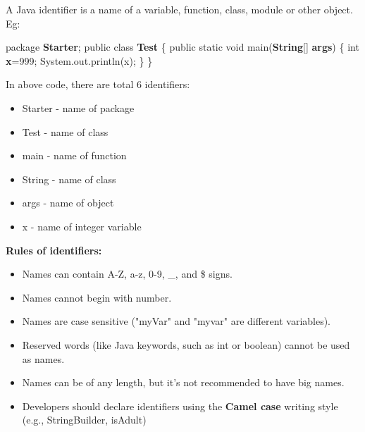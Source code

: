 
\begin{flushleft}
	
	A Java identifier is a name of a variable, function, class, module or other object.
	\newline
	Eg:
	\begin{tcolorbox}[breakable,notitle,boxrule=-0pt,colback=code,colframe=code]
		\color{black}
		\font=8pt
		package \textbf{Starter}; \newline
		\newline
		public class \textbf{Test} \{ \newline
		\hphantom{} \hphantom{}	public static void main(\textbf{String}[] \textbf{args}) \{ \newline
		\hphantom{} \hphantom{} \hphantom{} \hphantom{}	int \textbf{x}=999; \newline
		\hphantom{} \hphantom{} \hphantom{} \hphantom{}	System.out.println(x); \newline
		\hphantom{} \hphantom{}	\} \newline
		\}
		\font=4pt
	\end{tcolorbox}
	
	\bigskip
	In above code, there are total 6 identifiers:
	\begin{itemize}
		\item Starter - name of package
		\item Test - name of class
		\item main - name of function
		\item String - name of class 
		\item args - name of object
		\item x - name of integer variable
	\end{itemize}
	
	\textbf{Rules of identifiers:}
	\begin{itemize}
		\item Names can contain A-Z, a-z, 0-9, \_, and \$ signs.
		\item Names cannot begin with number.
		\item Names are case sensitive ("myVar" and "myvar" are different variables).
		\item Reserved words (like Java keywords, such as int or boolean) cannot be used as names.
		\item Names can be of any length, but it's not recommended to have big names.
		\item Developers should declare identifiers using the \textbf{Camel case} writing style (e.g., StringBuilder, isAdult)
	\end{itemize}
	

\end{flushleft}
